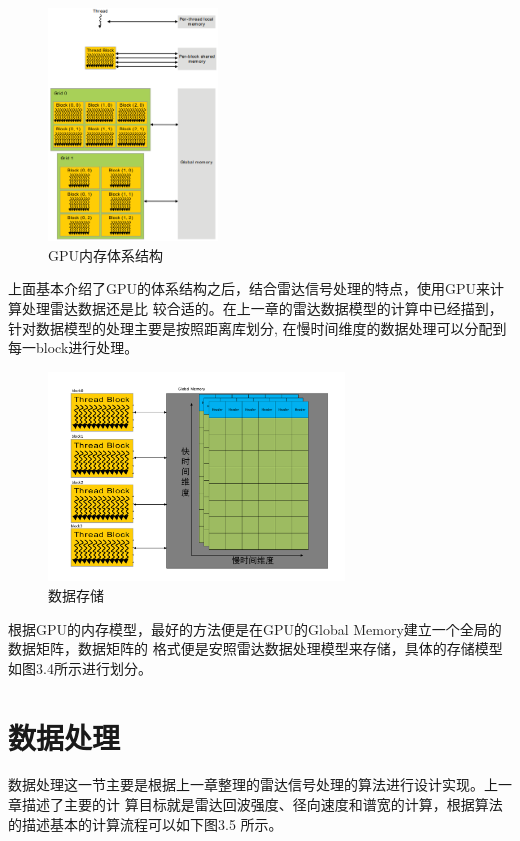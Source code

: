\documentclass[a4paper,12pt]{report}
\begin{document}
\begin{spacing}{1.5}
\begin{figure}[hbtp]
    \centering
    \includegraphics [width=0.4\textwidth]{figure//memory.png}
    \caption{GPU内存体系结构}\label{memory}
\end{figure}

上面基本介绍了GPU的体系结构之后，结合雷达信号处理的特点，使用GPU来计算处理雷达数据还是比
较合适的。在上一章的雷达数据模型的计算中已经描到，针对数据模型的处理主要是按照距离库划分,
在慢时间维度的数据处理可以分配到每一block进行处理。

\begin{figure}[H]
    \centering
    \includegraphics [width=0.7\textwidth]{figure//DataCache.pdf}
    \caption{数据存储}\label{DataCache}
\end{figure}


根据GPU的内存模型，最好的方法便是在GPU的Global Memory建立一个全局的数据矩阵，数据矩阵的
格式便是安照雷达数据处理模型来存储，具体的存储模型如图3.4所示进行划分。

\section{数据处理}
数据处理这一节主要是根据上一章整理的雷达信号处理的算法进行设计实现。上一章描述了主要的计
算目标就是雷达回波强度、径向速度和谱宽的计算，根据算法的描述基本的计算流程可以如下图3.5
所示。


\end{spacing}
\end{document}
